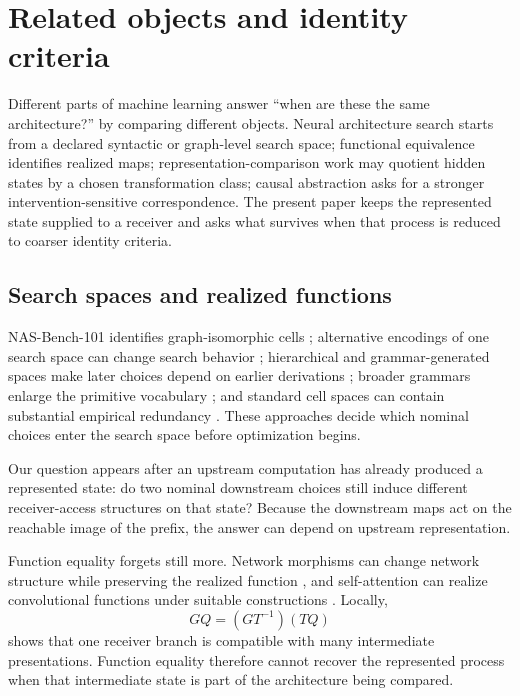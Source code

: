 \section{Related objects and identity criteria}\label{sec:related-objects}

Different parts of machine learning answer ``when are these the same architecture?'' by comparing different objects. Neural architecture search starts from a declared syntactic or graph-level search space; functional equivalence identifies realized maps; representation-comparison work may quotient hidden states by a chosen transformation class; causal abstraction asks for a stronger intervention-sensitive correspondence. The present paper keeps the represented state supplied to a receiver and asks what survives when that process is reduced to coarser identity criteria.

\subsection{Search spaces and realized functions}

NAS-Bench-101 identifies graph-isomorphic cells \citep{ying2019nasbench}; alternative encodings of one search space can change search behavior \citep{white2020encodings}; hierarchical and grammar-generated spaces make later choices depend on earlier derivations \citep{schrodi2023hierarchical}; broader grammars enlarge the primitive vocabulary \citep{ericsson2024einspace}; and standard cell spaces can contain substantial empirical redundancy \citep{wan2022redundancy}. These approaches decide which nominal choices enter the search space before optimization begins.

Our question appears after an upstream computation has already produced a represented state: do two nominal downstream choices still induce different receiver-access structures on that state? Because the downstream maps act on the reachable image of the prefix, the answer can depend on upstream representation.

Function equality forgets still more. Network morphisms can change network structure while preserving the realized function \citep{wei2016networkmorphism}, and self-attention can realize convolutional functions under suitable constructions \citep{cordonnier2020relationship}. Locally,
\[
GQ=(GT^{-1})(TQ)
\]
shows that one receiver branch is compatible with many intermediate presentations. Function equality therefore cannot recover the represented process when that intermediate state is part of the architecture being compared.

